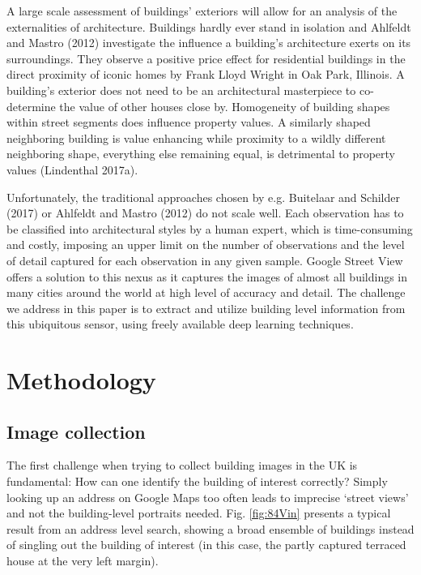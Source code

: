 \documentclass[]{article}
\begin{document}
A large scale assessment of buildings' exteriors will allow for an
analysis of the externalities of architecture. Buildings hardly ever
stand in isolation and Ahlfeldt and Mastro (2012) investigate the
influence a building's architecture exerts on its surroundings. They
observe a positive price effect for residential buildings in the direct
proximity of iconic homes by Frank Lloyd Wright in Oak Park, Illinois. A
building's exterior does not need to be an architectural masterpiece to
co-determine the value of other houses close by. Homogeneity of building
shapes within street segments does influence property values. A
similarly shaped neighboring building is value enhancing while proximity
to a wildly different neighboring shape, everything else remaining
equal, is detrimental to property values (Lindenthal 2017a).

Unfortunately, the traditional approaches chosen by e.g. Buitelaar and
Schilder (2017) or Ahlfeldt and Mastro (2012) do not scale well. Each
observation has to be classified into architectural styles by a human
expert, which is time-consuming and costly, imposing an upper limit on
the number of observations and the level of detail captured for each
observation in any given sample. Google Street View offers a solution to
this nexus as it captures the images of almost all buildings in many
cities around the world at high level of accuracy and detail. The
challenge we address in this paper is to extract and utilize building
level information from this ubiquitous sensor, using freely available
deep learning techniques.

\hypertarget{methodology}{%
\section{Methodology}\label{methodology}}

\hypertarget{image-collection}{%
\subsection{Image collection}\label{image-collection}}

The first challenge when trying to collect building images in the UK is
fundamental: How can one identify the building of interest correctly?
Simply looking up an address on Google Maps too often leads to imprecise
`street views' and not the building-level portraits needed. Fig.
\ref{fig:84Vin} presents a typical result from an address level search,
showing a broad ensemble of buildings instead of singling out the
building of interest (in this case, the partly captured terraced house
at the very left margin).
\end{document}
